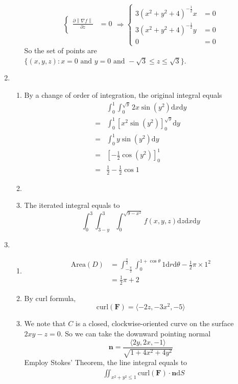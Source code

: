 \documentclass[12pt]{article}
\newcommand{\diff}{\mathrm{d}}
\newcommand\norm[1]{\left\lVert#1\right\rVert}
\theoremstyle{definition}
\begin{document}
\begin{enumerate}
\begin{enumerate}
\[\begin{cases}
\frac{\partial \norm{\nabla f}}{\partial z} &= 0\\
\end{cases}\Rightarrow
\begin{cases}
3(x^2+y^2+4)^{-\frac{1}{2}}x&=0\\
3(x^2+y^2+4)^{-\frac{1}{2}}y&=0\\
0&=0
\end{cases}
  \]
  So the set of points are $\{(x,y,z): x=0\text{ and }y=0\text{ and }-\sqrt{3}\leq z\leq \sqrt{3}\}$.
  \end{enumerate}
  \item \begin{enumerate} %
    \item By a change of order of integration, the original integral equals
    \begin{align*}
    &\int_0^1\int_0^{\sqrt{y}} 2x\sin(y^2)       \diff x\diff y\\
    =&\int_0^1 [x^2\sin(y^2)]_0^{\sqrt{y}}\diff y\\
    =&\int_0^1 y\sin(y^2)\diff y\\
    =&[-\frac{1}{2}\cos(y^2)]_0^1\\
    =&\frac{1}{2}-\frac{1}{2}\cos 1
    \end{align*}
    \item 
    \item The iterated integral equals to 
    \[
\int_0^3 \int_{3-y}^3 \int_0^{\sqrt{9-x^2}} f(x,y,z)\diff z \diff x \diff y
    \]
  \end{enumerate}
  \item \begin{enumerate}
  \item \begin{align*}
  \text{Area}(D)&=\int_{-\frac{\pi}{2}}^{\frac{\pi}{2}}\int_0^{1+\cos\theta} 1\diff r\diff \theta-\frac{1}{2}\pi\times 1^2\\
  &=\frac{1}{2}\pi+2
  \end{align*}
    \item By curl formula, \[
    \text{curl}(\mathbf{F})=\langle -2z,-3x^2,-5\rangle
    \]
    \item We note that $C$ is a closed, clockwise-oriented curve on the surface $2xy-z=0$. So we can take the downward pointing normal 
    \[
\mathbf{n}=\frac{\langle 2y, 2x, -1\rangle}{\sqrt{1+4x^2+4y^2}}
    \]
    Employ Stokes' Theorem, the line integral equals to
    \begin{align*}
&\iint_{x^2+y^2\leq 1}\text{curl}(\mathbf{F})\cdot\mathbf{n}\diff S\\

\end{align*}
\end{enumerate}
\end{enumerate}
\end{document}

